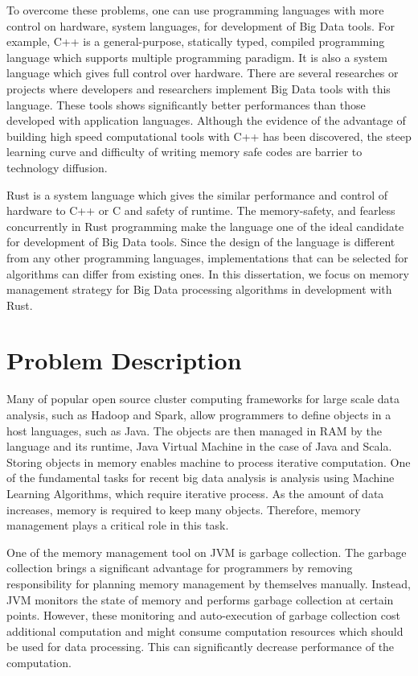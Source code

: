 To overcome these problems, one can use programming languages with more control on hardware, system languages, for development of Big Data tools. For example, C++ is a general-purpose, statically typed, 
compiled programming language which supports multiple programming paradigm. It is also a system language which gives full control over hardware. 
There are several researches or projects \cite{DBLP:conf/sigmod/0001BLLMSTYJ18} where developers and 
researchers implement Big Data tools with this language. These tools shows significantly better performances than those developed with application languages. 
Although the evidence of the advantage of building high speed computational tools with C++ has been discovered, the steep learning curve and difficulty of writing memory safe codes are barrier to technology diffusion.

Rust is a system language which gives the similar performance and control of hardware to C++ or C and safety of runtime. The memory-safety, and fearless concurrently in Rust programming 
make the language one of the ideal candidate for development of Big Data tools. 
Since the design of the language is different from any other programming languages, implementations that can be selected for algorithms can differ from existing ones.
In this dissertation, we focus on memory management strategy for Big Data processing algorithms in development with Rust. 


\section{Problem Description}
\label{sec:probdesc}

Many of popular open source cluster computing frameworks for large scale data analysis, 
such as Hadoop and Spark, allow programmers to define objects in a host languages, such as Java.
The objects are then managed in RAM by the language and its runtime, Java Virtual Machine 
in the case of Java and Scala. Storing objects in memory enables machine to process iterative computation. 
One of the fundamental tasks for recent big data analysis is analysis using Machine Learning Algorithms, 
which require iterative process. As the amount of data increases, memory is required to keep many objects. 
Therefore, memory management plays a critical role in this task. 

One of the memory management tool on JVM is garbage collection. 
The garbage collection brings a significant advantage for programmers by removing responsibility
for planning memory management by themselves manually. Instead, JVM monitors the state of memory and performs garbage
collection at certain points. However, these monitoring and auto-execution of garbage collection cost additional 
computation and might consume computation resources which should be used for data processing. This can significantly decrease performance of the computation. 

